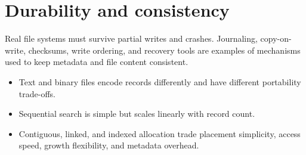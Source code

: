 \section{Durability and consistency}
Real file systems must survive partial writes and crashes. Journaling, copy-on-write, checksums, write ordering, and recovery tools are examples of mechanisms used to keep metadata and file content consistent.





\begin{chapterrecap}
\begin{itemize}
  \item Text and binary files encode records differently and have different portability trade-offs.
  \item Sequential search is simple but scales linearly with record count.
  \item Contiguous, linked, and indexed allocation trade placement simplicity, access speed, growth flexibility, and metadata overhead.
\end{itemize}
\end{chapterrecap}
